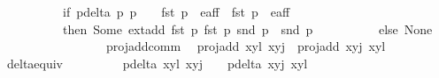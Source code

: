 \begin{isabellebody}
\ \ \ \ \ \ \ \ \ \ if\ {\isacharparenleft}p{\isacharunderscore}delta{\isacharprime}\ p{}\ p{}\ {\isasymnoteq}\ {}\ {\isasymand}\ fst\ p{}\ {\isasymin}\ e{\isacharunderscore}aff\ {\isasymand}\ fst\ p{}\ {\isasymin}\ e{\isacharunderscore}aff{\isacharparenright}\ \ \ \isanewline
\ \ \ \ \ \ \ \ \ \ then\ Some\ {\isacharparenleft}ext{\isacharunderscore}add\ {\isacharparenleft}fst\ p{}{\isacharparenright}\ {\isacharparenleft}fst\ p{}{\isacharparenright}{\isacharcomma}\ {\isacharparenleft}snd\ p{}{\isacharparenright}\ {\isacharplus}\ {\isacharparenleft}snd\ p{}{\isacharparenright}{\isacharparenright}\isanewline
\ \ \ \ \ \ \ \ \ \ else\ None\isanewline
\ \ \ \ \ \ \ \ {\isacharparenright}\isanewline
\ \ \ \ {\isacharparenright}\isanewline
\ \ {\isachardoublequoteclose}\isanewline
\isanewline
{}\isamarkupfalse%
\ proj{\isacharunderscore}add{\isacharunderscore}comm{\isacharcolon}\isanewline
\ \ {\isachardoublequoteopen}proj{\isacharunderscore}add\ {\isacharparenleft}{\isacharparenleft}x{}{\isacharcomma}y{}{\isacharparenright}{\isacharcomma}l{\isacharparenright}\ {\isacharparenleft}{\isacharparenleft}x{}{\isacharcomma}y{}{\isacharparenright}{\isacharcomma}j{\isacharparenright}\ {\isacharequal}\ proj{\isacharunderscore}add\ {\isacharparenleft}{\isacharparenleft}x{}{\isacharcomma}y{}{\isacharparenright}{\isacharcomma}j{\isacharparenright}\ {\isacharparenleft}{\isacharparenleft}x{}{\isacharcomma}y{}{\isacharparenright}{\isacharcomma}l{\isacharparenright}{\isachardoublequoteclose}\isanewline
%
\isadelimproof
%
\endisadelimproof
%
\isatagproof
{}\isamarkupfalse%
\ {\isacharminus}\isanewline
\ \ \isamarkupfalse%
\ delta{\isacharunderscore}equiv{\isacharcolon}\ \ \isanewline
\ \ \ \ \ \ \ {\isachardoublequoteopen}{\isacharparenleft}p{\isacharunderscore}delta\ {\isacharparenleft}{\isacharparenleft}x{}{\isacharcomma}y{}{\isacharparenright}{\isacharcomma}l{\isacharparenright}\ {\isacharparenleft}{\isacharparenleft}x{}{\isacharcomma}y{}{\isacharparenright}{\isacharcomma}j{\isacharparenright}\ {\isasymnoteq}\ {}{\isacharparenright}\ {\isacharequal}\ {\isacharparenleft}p{\isacharunderscore}delta\ {\isacharparenleft}{\isacharparenleft}x{}{\isacharcomma}y{}{\isacharparenright}{\isacharcomma}j{\isacharparenright}\ {\isacharparenleft}{\isacharparenleft}x{}{\isacharcomma}y{}{\isacharparenright}{\isacharcomma}l{\isacharparenright}\ {\isasymnoteq}\ {}{\isacharparenright}{\isachardoublequoteclose}\isanewline

\end{isabellebody}

